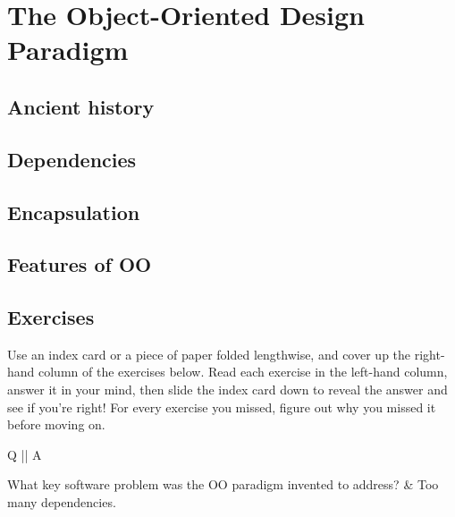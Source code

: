 
\chapter{The Object-Oriented Design Paradigm}

\section{Ancient history}




\section{Dependencies}

\section{Encapsulation}

\section{Features of OO}

\section{Exercises}

Use an index card or a piece of paper folded lengthwise, and cover up the
right-hand column of the exercises below. Read each exercise in the
left-hand column, answer it in your mind, then slide the index card down to
reveal the answer and see if you're right! For every exercise you missed,
figure out why you missed it before moving on.

\begin{small}
\begin{enumerate}
\begin{longtable}{Q || A}
\hline
\item 
What key software problem was the OO paradigm invented to address?
&
Too many dependencies.
\\
\hline

\end{longtable}
\end{enumerate}
\end{small}
